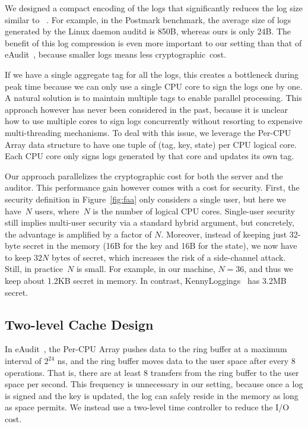 \documentclass[sigconf]{sty/acmart}
\newcommand{\heading}[1]{\vspace{6pt}\noindent{\underline{\textsc{#1}}}}
\newcommand{\figref}[1]{Figure~\ref{#1}}
\begin{document}
\heading{Semantic Field Encoding.} We designed a compact encoding of the logs that significantly reduces the log size similar to ~\cite{Sekar2023eAA,hossain2017sleuth}.
For example, in the Postmark benchmark, the average size of logs generated by the Linux daemon auditd
is 850B, whereas ours is only 24B.
The benefit of this log compression is even more important to our setting than that of eAudit~\cite{Sekar2023eAA},
because smaller logs means less cryptographic~cost.

 

\heading{Multiple signing lines.} If we have a single aggregate tag for all the logs, 
this creates a bottleneck during peak time because we can only use a single CPU core
to sign the logs one by one. 
A natural solution is to maintain multiple tags to enable parallel processing. 
This approach however has never been considered in the past, 
because it is unclear how to use multiple cores to sign logs concurrently without resorting to expensive multi-threading mechanisms. 
To deal with this issue, we leverage the Per-CPU Array data structure to have one tuple of (tag, key, state) per CPU logical core. 
Each CPU core only signs logs generated by that core and updates its own tag. 

Our approach parallelizes the cryptographic cost for both the server and the auditor. 
This performance gain however comes with a cost for security. 
First, the security definition in \figref{fig:faa} only considers a single user, 
but here we have~$N$ users, where~$N$ is the number of logical CPU cores. 
Single-user security still implies multi-user security via a standard hybrid argument, 
but concretely, the advantage is amplified by a factor of $N$. 
Moreover, instead of keeping just 32-byte secret in the memory (16B for the key and 16B for the state), 
we now have to keep $32N$ bytes of secret, which increases the risk of a side-channel attack. 
Still, in practice~$N$ is small. 
For example, in our machine, $N = 36$, 
and thus we keep about 1.2KB secret in memory. 
In contrast, KennyLoggings~\cite{kennylog} has 3.2MB secret. 

\subsection{Two-level Cache Design} \label{s:cache}


In eAudit~\cite{Sekar2023eAA}, the Per-CPU Array pushes data to the ring buffer at a maximum interval of $2^{24}$ ns,
and the ring buffer moves data to the user space after every $8$ operations.
That is, there are at least 8 transfers from the ring buffer to the user space per second.
This frequency is unnecessary in our setting, because once a log is signed and the key is updated,
the log can safely reside in the memory as long as space permits.
We instead use a two-level time controller to reduce the I/O cost.
\end{document}
